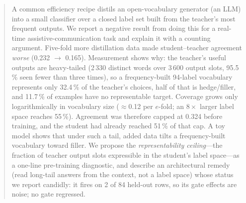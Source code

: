 \begin{abstract}
A common efficiency recipe distils an open-vocabulary generator (an LLM) into
a small classifier over a closed label set built from the teacher's most
frequent outputs. We report a negative result from doing this for a real-time
assistive-communication task and explain it with a counting argument.
Five-fold more distillation data made student--teacher agreement \emph{worse}
(0.232 $\to$ 0.165). Measurement shows why: the teacher's useful outputs are
heavy-tailed (2\,330 distinct words over 3\,600 output slots, 95.5\,\% seen
fewer than three times), so a frequency-built 94-label vocabulary represents
only 32.4\,\% of the teacher's choices, half of that is hedge/filler, and
11.7\,\% of examples have no representable target. Coverage grows only
logarithmically in vocabulary size ($\approx$0.12 per $e$-fold; an $8\times$
larger label space reaches 55\,\%). Agreement was therefore capped at 0.324
before training, and the student had already reached 51\,\% of that cap. A toy
model shows that under such a tail, added data tilts a frequency-built
vocabulary toward filler. We propose the \emph{representability ceiling}---the
fraction of teacher output slots expressible in the student's label space---as
a one-line pre-training diagnostic, and describe an architectural remedy (read
long-tail answers from the context, not a label space) whose status we report
candidly: it fires on 2 of 84 held-out rows, so its gate effects are noise; no
gate regressed.
\end{abstract}

